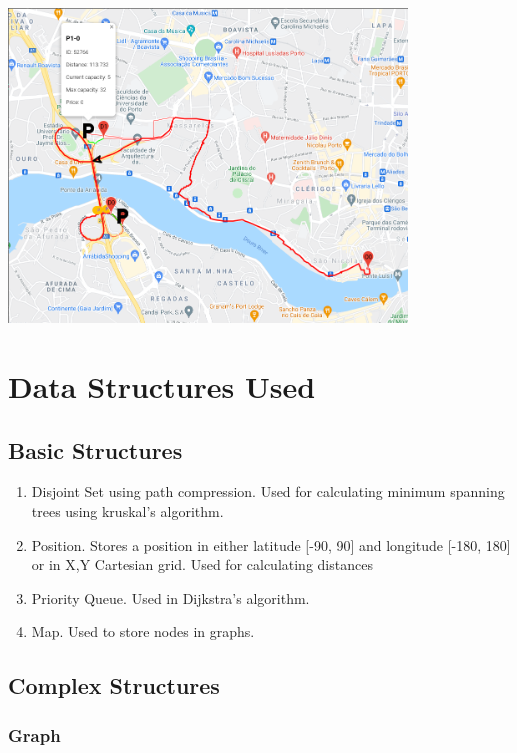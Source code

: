 \documentclass[a4paper, 12pt]{report}
\begin{document}
    \begin{center}
        \includegraphics[width = 400px]{img/view.png}
    \end{center}
    
    
    \chapter{Data Structures Used}
    
    \section{Basic Structures}
    
    \begin{enumerate}
        \item Disjoint Set using path compression. Used for calculating minimum spanning trees using kruskal's algorithm.
        \item Position. Stores a position in either latitude [-90, 90] and longitude [-180, 180] or in X,Y Cartesian grid. Used for calculating distances
        \item Priority Queue. Used in Dijkstra's algorithm.
        \item Map. Used to store nodes in graphs.
    \end{enumerate}
    
    \section{Complex Structures}
    
    \subsection{Graph}
    
\end{document}
